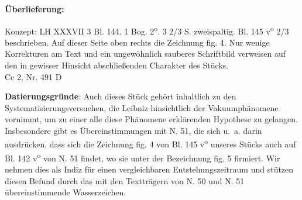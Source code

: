       
               
                \begin{ledgroupsized}[r]{120mm}
                \footnotesize 
                \pstart                
                \noindent\textbf{\"{U}berlieferung:}   
                \pend
                \end{ledgroupsized}
            
              
                            \begin{ledgroupsized}[r]{114mm}
                            \footnotesize 
                            \pstart \parindent -6mm
                            Konzept: LH XXXVII 3 Bl. 144. 1 Bog. 2\textsuperscript{o}. 3 2/3 S. zweispaltig. Bl. 145 v\textsuperscript{o} 2/3 beschrieben. Auf dieser Seite oben rechts die Zeichnung fig. 4. Nur wenige Korrekturen am Text und ein ungew\"{o}hnlich sauberes Schriftbild verweisen auf den in gewisser Hinsicht abschließenden Charakter des St\"{u}cks.\\Cc 2, Nr. 491 D \pend
                            \end{ledgroupsized}
                \vspace*{5mm}
                \begin{ledgroup}
                \footnotesize 
                \pstart
            \noindent\footnotesize{\textbf{Datierungsgr\"{u}nde}: Auch dieses St\"{u}ck geh\"{o}rt inhaltlich zu den Systematisierungsversuchen, die Leibniz hinsichtlich der Vakuumph\"{a}nomene vornimmt, um zu einer alle diese Ph\"{a}nomene erkl\"{a}renden Hypothese zu gelangen. Insbesondere gibt es \"{U}bereinstimmungen mit N. 51, die sich u.~a. darin ausdr\"{u}cken, dass sich die Zeichnung fig. 4 von Bl. 145 v\textsuperscript{o} unseres St\"{u}cks auch auf Bl. 142 v\textsuperscript{o} von N. 51 findet, wo sie unter der Bezeichnung fig. 5 firmiert. Wir nehmen dies als Indiz f\"{u}r einen vergleichbaren Entstehungszeitraum und st\"{u}tzen diesen Befund durch das mit den Texttr\"{a}gern von N. 50 und N. 51 \"{u}bereinstimmende Wasserzeichen.}
                \pend
                \end{ledgroup}
            
